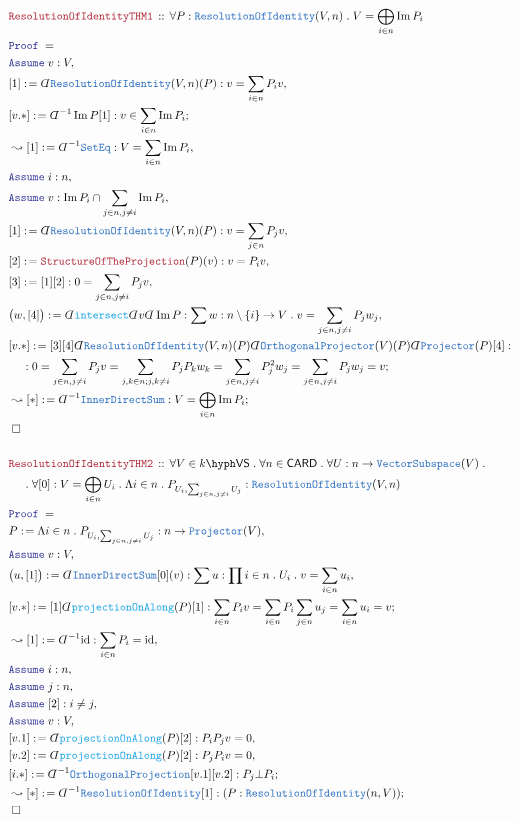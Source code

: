 \documentclass[12pt]{scrartcl}%
\newcommand{\TYPE}[1]{\textcolor{NavyBlue}{\mathtt{#1}}}%
\newcommand{\FUNC}[1]{\textcolor{Cerulean}{\mathtt{#1}}}%
\newcommand{\LOGIC}[1]{\textcolor{Blue}{\mathtt{#1}}}%
\newcommand{\THM}[1]{\textcolor{Maroon}{\mathtt{#1}}}%
\renewcommand{\.}{\; . \;} %
\newcommand{\de}{: \kern 0.1pc =} %
\newcommand{\Theorem}[2]{& \THM{#1} \, :: \, #2 \\ & \Proof = \\ } %
\newcommand{\NewLine}{\\ & \kern 1pc}%
\newcommand{\Page}[1]{ \begin{align*} #1 \end{align*}  }%
\newcommand{ \bd }{ \ByDef }%
\DeclareMathOperator*{\id}{id}%
\DeclareMathOperator*{\im}{Im}%
\newcommand{\Say}[3]{& #1 \de #2 : #3, \\} %
\newcommand{\Conclude}[3]{& #1 \de #2 : #3; \\}%
\newcommand{\Derive}[3]{& \leadsto #1 \de #2 : #3, \\} %
\newcommand{\DeriveConclude}[3]{& \leadsto #1 \de #2 : #3 ; \\} %
\newcommand{\Assume}[2]{& \LOGIC{Assume} \; #1 : #2, \\} %
\newcommand{\QED}{\; \square} %
\newcommand{\EndProof}{& \QED \\} %
\newcommand{\ByDef}{\rotatebox[origin=c]{-180}{$D$}}%
\newcommand{\Proof}{\LOGIC{Proof} \; } %
\newcommand{\VS}[1]{#1\hyph\mathsf{VS}} %
\begin{document}
\Page{
	\Theorem{ResolutionOfIdentityTHM1}{\forall P : \TYPE{ResolutionOfIdentity}(V,n) \. V = \bigoplus_{i \in n} \im P_i}
	\Assume{v}{V}
	\Say{[1]}{\bd \TYPE{ResolutionOfIdentity}(V,n)(P)}{v = \sum_{i \in n}P_i v}
	\Conclude{[v.*]}{\bd^{-1} \im P [1]   }{v \in \sum_{i \in n} \im P_i}
	\Derive{[1]}{\bd^{-1}\TYPE{SetEq}}{V = \sum_{i \in n} \im P_i}
	\Assume{i}{n}
	\Assume{v}{\im P_i \cap \sum_{j \in n, j \neq i} \im P_i}
	\Say{[1]}{\bd \TYPE{ResolutionOfIdentity}(V,n)(P)}{v = \sum_{j \in n}P_j v}
	\Say{[2]}{\THM{StructureOfTheProjection}(P)(v)}{v = P_iv}
	\Say{[3]}{[1][2]}{0 = \sum_{j\in n, j \neq i} P_jv }
	\Say{\big(w,[4]\big)}{\bd \FUNC{intersect}\bd v\bd \im P}{\sum w :  n \setminus \{i\} \to V \. v = \sum_{j \in n,j\neq i} P_jw_j }
	\Conclude{[v.*]}{[3][4]\bd \TYPE{ResolutionOfIdentity}(V,n)(P)\bd \TYPE{OrthogonalProjector}(V)(P)\bd \TYPE{Projector}(P) [4]}{
		\NewLine : 0 =  
		\sum_{j \in n, j \neq i} P_jv = 
		\sum_{j,k \in n;j,k \neq i} P_jP_kw_k =
		\sum_{j \in n, j \neq i} P^2_jw_j =
		\sum_{j \in n, j \neq i} P_jw_j = 
		v
	}
	\DeriveConclude{[*]}{\bd^{-1}\TYPE{InnerDirectSum}}{V = \bigoplus_{i \in n} \im P_i}
	\EndProof
	\\
	\Theorem{ResolutionOfIdentityTHM2}{\forall V \in \VS{k} \. \forall n \in \mathsf{CARD} \. \forall U : n \to \TYPE{VectorSubspace}(V) \. \NewLine \. 
		\forall [0]: V = \bigoplus_{i \in n} U_i \. \Lambda i \in n \. P_{U_i,\sum_{j\in n,j\neq i} U_j}  : \TYPE{ResolutionOfIdentity}(V,n)} 
	\Say{P}{\Lambda i \in n \. P_{U_i,\sum_{j\in n,j\neq i} U_j}}{  n \to \TYPE{Projector}(V)   }
	\Assume{v}{V}
	\Say{\big(u,[1]\big)}{\bd \TYPE{InnerDirectSum}[0](v)}{\sum u : \prod i \in n \. U_i \. v = \sum_{i \in n} u_i}
	\Conclude{[v.*]}{[1]\bd \FUNC{projectionOnAlong}(P) [1]}{
			\sum_{i \in n} P_i v =
			\sum_{i \in n} P_i\sum_{j \in n} u_j = 
			\sum_{i \in n} u_i = v
		}
	\Derive{[1]}{\bd^{-1}{\id}}{\sum_{i \in n} P_i = \id}
	\Assume{i}{n}
	\Assume{j}{n}
	\Assume{[2]}{i \neq j}
	\Assume{v}{V}
	\Say{[v.1]}{\bd \FUNC{projectionOnAlong}(P)[2]}{P_iP_jv = 0}
	\Say{[v.2]}{\bd \FUNC{projectionOnAlong}(P)[2]}{P_jP_iv = 0}
	\Conclude{[i.*]}{\bd^{-1}\TYPE{OrthogonalProjection}[v.1][v.2]}{P_j \bot P_i }
	\DeriveConclude{[*]}{\bd^{-1}\TYPE{ResolutionOfIdentity}[1]}{(P : \TYPE{ResolutionOfIdentity}(n,V))}
	\EndProof
}
\end{document}
